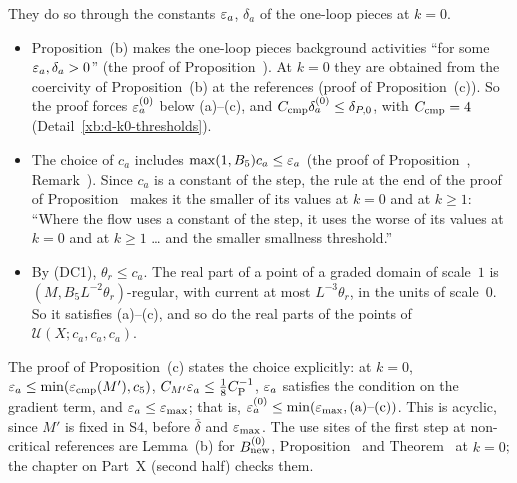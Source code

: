 \begin{detail}
\begin{step}\label{det:ledger-eps-M-noncrit}
They do so through the constants $\varepsilon_a$, $\delta_a$ of the one-loop pieces at $k=0$.
\begin{itemize}
\item Proposition~(b) makes the one-loop pieces background activities ``for some $\varepsilon_a,\delta_a>0$'' (the proof of Proposition~). At $k=0$ they are obtained from the coercivity of Proposition~(b) at the references (proof of Proposition~(c)). So the proof forces $\varepsilon^{(0)}_a$ below (a)--(c), and $C_{\rm cmp}\delta^{(0)}_a\le\delta_{P,0}$, with $C_{\rm cmp}=4$ (Detail~\ref{xb:d-k0-thresholds}).
\item The choice of $c_a$ includes $\max(1,B_5)c_a\le\varepsilon_a$ (the proof of Proposition~, Remark~). Since $c_a$ is a constant of the step, the rule at the end of the proof of Proposition~ makes it the smaller of its values at $k=0$ and at $k\ge1$: ``Where the flow uses a constant of the step, it uses the worse of its values at $k=0$ and at $k\ge1$ \dots{} and the smaller smallness threshold.''
\item By (DC1), $\theta_r\le c_a$. The real part of a point of a graded domain of scale~$1$ is $(M,B_5L^{-2}\theta_r)$-regular, with current at most $L^{-3}\theta_r$, in the units of scale~$0$. So it satisfies (a)--(c), and so do the real parts of the points of $\mathcal U(X;c_a,c_a,c_a)$.
\end{itemize}
The proof of Proposition~(c) states the choice explicitly: at $k=0$, $\varepsilon_a\le\min(\varepsilon_{\rm cmp}(M'),c_5)$, $C_{M'}\varepsilon_a\le\frac18C_{\rm P}^{-1}$, $\varepsilon_a$ satisfies the condition on the gradient term, and $\varepsilon_a\le\varepsilon_{\max}$; that is, $\varepsilon^{(0)}_a\le\min(\varepsilon_{\max},\text{(a)--(c)})$. This is acyclic, since $M'$ is fixed in S4, before $\bar\delta$ and $\varepsilon_{\max}$. The use sites of the first step at non-critical references are Lemma~(b) for $B^{(0)}_{\rm new}$, Proposition~ and Theorem~ at $k=0$; the chapter on Part~X (second half) checks them.
\end{step}
\end{detail}

